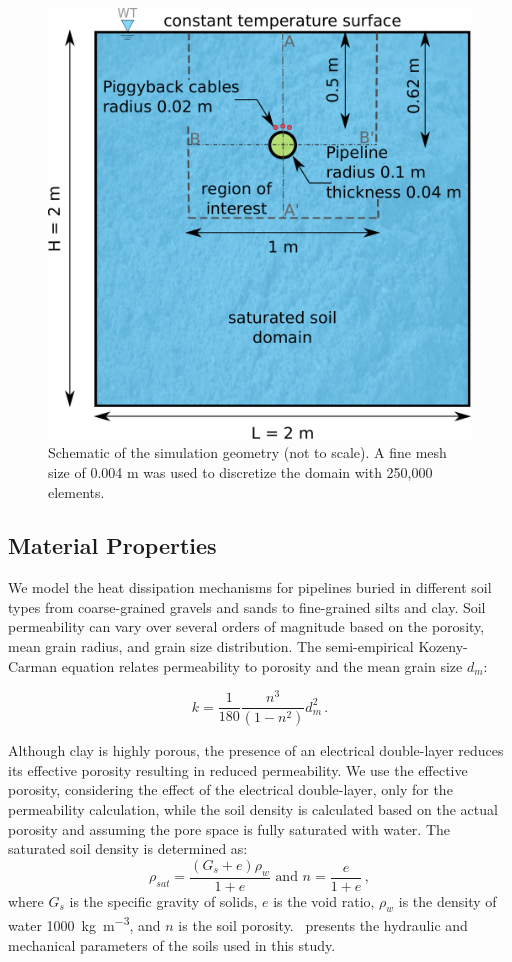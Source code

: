 \documentclass[Journal,letterpaper,InsideFigs]{ascelike-new}
\begin{document}
\begin{figure}[htbp]
    \centering
    \includegraphics[width=0.7\linewidth]{figs/model.pdf}
    \caption{Schematic of the simulation geometry (not to scale). A fine mesh size of 0.004 m was used to discretize the domain with 250,000 elements.}
    \label{fig:model}
\end{figure}

\subsection*{Material Properties}
We model the heat dissipation mechanisms for pipelines buried in different soil types from coarse-grained gravels and sands to fine-grained silts and clay. Soil permeability can vary over several orders of magnitude based on the porosity, mean grain radius, and grain size distribution. The semi-empirical Kozeny-Carman equation relates permeability to porosity and the mean grain size $d_m$:

\begin{equation}
k = \frac{1}{180} \frac{n^3}{(1-n^2)} d_m^2\,.
\end{equation}

Although clay is highly porous, the presence of an electrical double-layer reduces its effective porosity resulting in reduced permeability. We use the effective porosity, considering the effect of the electrical double-layer, only for the permeability calculation, while the soil density is calculated based on the actual porosity and assuming the pore space is fully saturated with water. The saturated soil density is determined as:
\begin{equation}
 \rho_{sat} = \frac{(G_s + e) \rho_w}{1+e} \text{ and } n = \frac{e}{1+e}\,,   
\end{equation}
where $G_s$ is the specific gravity of solids, $e$ is the void ratio, $\rho_w$ is the density of water \SI{1000}{\kilogram\per\meter\cubed}, and $n$ is the soil porosity.~ presents the hydraulic and mechanical parameters of the soils used in this study. 
\end{document}
